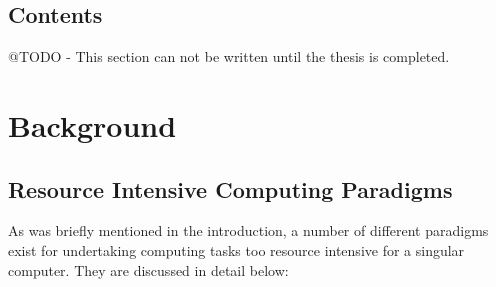 \documentclass[twoside]{report}
\begin{document}
\section{Contents}

@TODO - This section can not be written until the thesis is completed.

\chapter{Background}

\section{Resource Intensive Computing Paradigms}

As was briefly mentioned in the introduction, a number of different paradigms
exist for undertaking computing tasks too resource intensive for a singular
computer. They are discussed in detail below:
\end{document}
